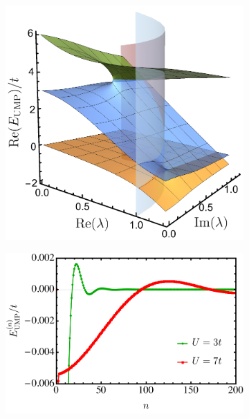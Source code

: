 \documentclass[aps,prb,reprint,noshowkeys,superscriptaddress]{revtex4-1}
\begin{document}
\begin{figure}
	\begin{subfigure}{0.32\textwidth}
	\includegraphics[height=0.75\textwidth]{fig6a}	
    \end{subfigure}
    \begin{subfigure}{0.32\textwidth}
	\includegraphics[height=0.75\textwidth]{fig6b}
		\subcaption{\label{subfig:UMP_cvg}}
    \end{subfigure}
    \begin{subfigure}{0.32\textwidth}

\end{subfigure}
\end{figure}
\end{document}
